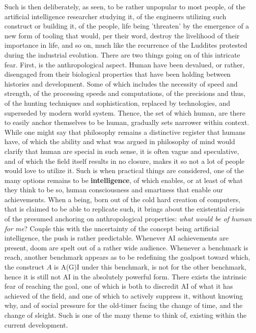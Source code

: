 Such is then deliberately, as seen, to be rather unpopular to most people, of the artificial intelligence researcher studying it, of the engineers utilizing such construct or building it, of the people, life being 'threaten' by the emergence of a new form of tooling that would, per their word, destroy the livelihood of their importance in life, and so on, much like the recurrence of the Luddites protested during the industrial evolution. There are two things going on of this intricate fear. First, is the anthropological aspect. Human have been devalued, or rather, disengaged from their biological properties that have been holding between histories and development. Some of which includes the necessity of speed and strength, of the processing speeds and computations, of the precisions and thus, of the hunting techniques and sophistication, replaced by technologies, and superseded by modern world system. Thence, the set of which human, are there to easily anchor themselves to be human, gradually sets narrower within context. While one might say that philosophy remains a distinctive register that humans have, of which the ability and what was argued in philosophy of mind would clarify that human are special in such sense, it is often vague and speculative, and of which the field itself results in no closure, makes it so not a lot of people would love to utilize it. Such is when practical things are considered, one of the many options remains to be \textbf{intelligence}, of which enables, or at least of what they think to be so, human consciousness and smartness that enable our achievements. When a being, born out of the cold hard creation of computers, that is claimed to be able to replicate such, it brings about the existential crisis of the presumed anchoring on anthropological properties: \textit{what would be of human for me}? Couple this with the uncertainty of the concept being artificial intelligence, the push is rather predictable. Whenever AI achievements are present, doom are spelt out of a rather wide audience. Whenever a benchmark is reach, another benchmark appears as to be redefining the goalpost toward which, the construct $A$ is A(G)I under this benchmark, is not for the other benchmark, hence it is still not AI in the absolutely powerful form. There exists the intrinsic fear of reaching the goal, one of which is both to discredit AI of what it has achieved of the field, and one of which to actively suppress it, without knowing why, and of social pressure for the old-timer facing the change of time, and the change of sleight. Such is one of the many theme to think of, existing within the current development. 

